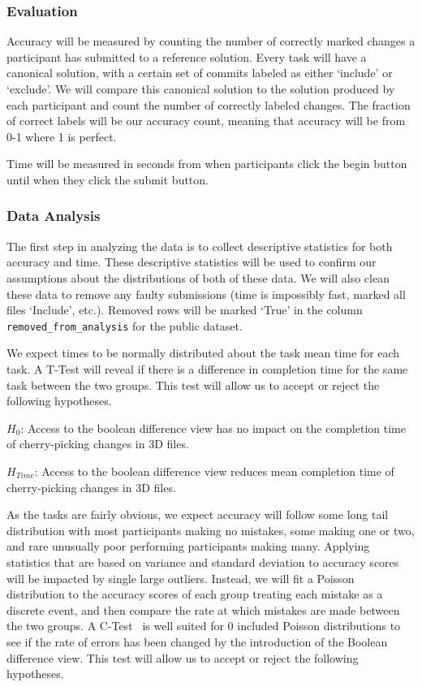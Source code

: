 \documentclass[sigconf,authorversion,nonacm]{acmart}
\begin{document}
\subsubsection{Evaluation}

Accuracy will be measured by counting the number of correctly marked changes a participant has submitted to a reference solution.
Every task will have a canonical solution, with a certain set of commits labeled as either `include' or `exclude'.
We will compare this canonical solution to the solution produced by each participant and count the number of correctly labeled changes.
The fraction of correct labels will be our accuracy count, meaning that accuracy will be from 0-1 where 1 is perfect.

Time will be measured in seconds from when participants click the begin button until when they click the submit button.

\subsubsection{Data Analysis}

The first step in analyzing the data is to collect descriptive statistics for both accuracy and time.
These descriptive statistics will be used to confirm our assumptions about the distributions of both of these data.
We will also clean these data to remove any faulty submissions (time is impossibly fast, marked all files `Include', etc.).
Removed rows will be marked `True' in the column \texttt{removed\_from\_analysis} for the public dataset.

We expect times to be normally distributed about the task mean time for each task.
A T-Test will reveal if there is a difference in completion time for the same task between the two groups.
This test will allow us to accept or reject the following hypotheses.

$H_{0}$: Access to the boolean difference view has no impact on the completion time of cherry-picking changes in 3D files.

$H_{Time}$: Access to the boolean difference view reduces mean completion time of cherry-picking changes in 3D files.

As the tasks are fairly obvious, we expect accuracy will follow some long tail distribution with most participants making no mistakes, some making one or two, and rare unusually poor performing participants making many.
Applying statistics that are based on variance and standard deviation to accuracy scores will be impacted by single large outliers.
Instead, we will fit a Poisson distribution to the accuracy scores of each group treating each mistake as a discrete event, and then compare the rate at which mistakes are made between the two groups.
A C-Test~\cite{przyborowski1940homogeneity} is well suited for 0 included Poisson distributions to see if the rate of errors has been changed by the introduction of the Boolean difference view.
This test will allow us to accept or reject the following hypotheses.
\end{document}
